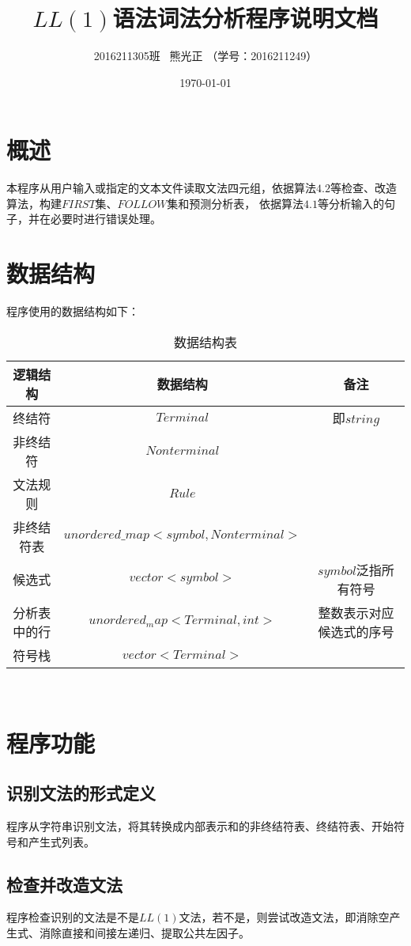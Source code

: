 \documentclass[UTF8]{ctexart}
\title{$LL(1)$语法词法分析程序说明文档}
\author{2016211305班 \ 熊光正 （学号：2016211249）}
\date{\today}
\begin{document}
\lstset{numbers=left,frame=single}
\maketitle
\tableofcontents
\clearpage
\section{概述}
本程序从用户输入或指定的文本文件读取文法四元组，依据算法$4.2$等检查、改造算法，构建$FIRST$集、$FOLLOW$集和预测分析表，
依据算法$4.1$等分析输入的句子，并在必要时进行错误处理。
\section{数据结构}
程序使用的数据结构如下：\\
\begin{table}[!h]
    \centering
    \caption{数据结构表}
    \begin{tabular}{|c|c|c|}
    \hline
    逻辑结构 & 数据结构 & 备注 \\ \hline
    终结符  &  $Terminal$ & 即$string$  \\ \hline
    非终结符  & $Nonterminal$  &   \\ \hline
    文法规则 & $Rule$  &   \\ \hline
    非终结符表 & $unordered\_map<symbol, Nonterminal>$  &   \\ \hline
    候选式 & $vector<symbol>$  & $symbol$泛指所有符号  \\ \hline
    分析表中的行 & $unordered_map<Terminal, int>$  & 整数表示对应候选式的序号  \\ \hline
    符号栈 & $vector<Terminal>$  &   \\ \hline
    \end{tabular}
    \end{table}
\\
\section{程序功能}
\subsection{识别文法的形式定义}
程序从字符串识别文法，将其转换成内部表示和的非终结符表、终结符表、开始符号和产生式列表。
\subsection{检查并改造文法}
程序检查识别的文法是不是$LL(1)$文法，若不是，则尝试改造文法，即消除空产生式、消除直接和间接左递归、提取公共左因子。
\end{document}
